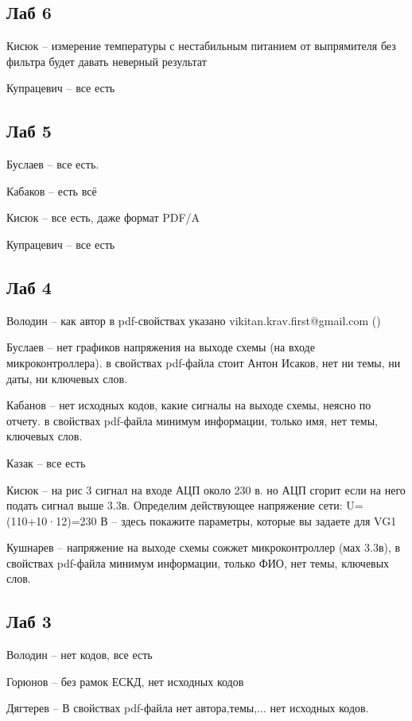 \documentclass[a4paper,11pt]{article}
\begin{document}
\newpage
{}
\recalctypearea

\subsection*{Лаб 6}
Кисюк -- измерение температуры с нестабильным питанием от выпрямителя без фильтра будет давать неверный результат

Купрацевич -- все есть

\subsection*{Лаб 5}
Буслаев -- все есть.

Кабаков -- есть всё

Кисюк -- все есть, даже формат PDF/A

Купрацевич -- все есть
\subsection*{Лаб 4}

Володин --  как автор в pdf-свойствах указано vikitan.krav.first@gmail.com ()

Буслаев -- нет графиков напряжения на выходе схемы (на входе микроконтроллера). в свойствах pdf-файла стоит Антон Исаков,
нет ни темы, ни даты, ни ключевых слов.

Кабанов -- нет исходных кодов, какие сигналы на выходе схемы, неясно по отчету.  в свойствах pdf-файла минимум информации,
только имя, нет темы, ключевых слов.

Казак -- все есть

Кисюк -- на рис 3 сигнал на входе АЦП около 230 в. но АЦП сгорит если на него подать сигнал выше 3.3в.  Определим действующее напряжение сети:
U=(110+10·12)=230 В  -- здесь покажите параметры, которые вы задаете для VG1

Кушнарев -- напряжение на выходе схемы сожжет микроконтроллер (мах 3.3в), в свойствах pdf-файла минимум информации,
только ФИО, нет темы, ключевых слов.

\newpage
\subsection*{Лаб 3}

Володин -- нет кодов, все есть

Горюнов -- без рамок ЕСКД, нет исходных кодов

Дягтерев --  В свойствах pdf-файла нет автора,темы,... нет исходных кодов.
\end{document}
